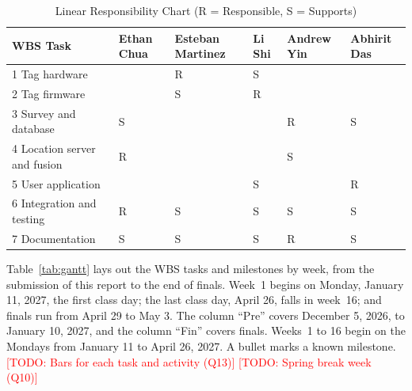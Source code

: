 \documentclass[12pt,letterpaper]{article}
\newenvironment{spectable}{\setstretch{1.0}\renewcommand{\arraystretch}{1.1}}{}
\newcommand{\TODO}[1]{\textcolor{red}{[TODO: #1]}}
\begin{document}
\begin{table}[H]
\caption{Linear Responsibility Chart (R = Responsible, S = Supports)}
\label{tab:lrc}
\centering
\begin{spectable}
\begin{tabularx}{\linewidth}{@{}Y *{5}{>{\centering\arraybackslash}p{0.72in}}@{}}
\toprule
\textbf{WBS Task} & \textbf{Ethan Chua} & \textbf{Esteban Martinez} & \textbf{Li Shi} & \textbf{Andrew Yin} & \textbf{Abhirit Das} \\
 Tag hardware & & R & S & & \\
2 Tag firmware & & S & R & & \\
3 Survey and database & S & & & R & S \\
4 Location server and fusion & R & & & S & \\
5 User application & & & S & & R \\
6 Integration and testing & R & S & S & S & S \\
7 Documentation & S & S & S & R & S \\
\bottomrule
\end{tabularx}
\end{spectable}
\end{table}

Table~\ref{tab:gantt} lays out the WBS tasks and milestones by week, from the submission of this
report to the end of finals. Week~1 begins on Monday, January 11, 2027, the first class day; the last
class day, April 26, falls in week~16; and finals run from April 29 to May 3. The column ``Pre''
covers December 5, 2026, to January 10, 2027, and the column ``Fin'' covers finals. Weeks~1 to 16
begin on the Mondays from January 11 to April 26, 2027. A bullet marks a known milestone.
\TODO{Bars for each task and activity (Q13)} \TODO{Spring break week (Q10)}
\end{document}
